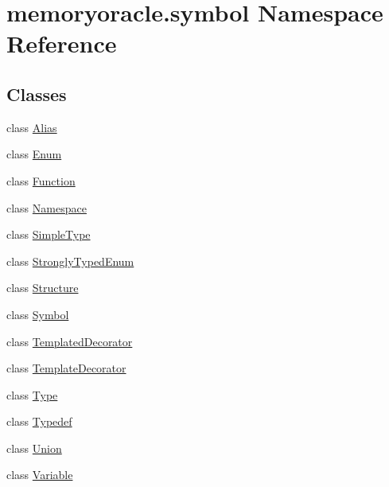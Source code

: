\hypertarget{namespacememoryoracle_1_1symbol}{}\section{memoryoracle.\+symbol Namespace Reference}
\label{namespacememoryoracle_1_1symbol}
\subsection*{Classes}
\begin{DoxyCompactItemize}
\item 
class \hyperlink{classmemoryoracle_1_1symbol_1_1Alias}{Alias}
\item 
class \hyperlink{classmemoryoracle_1_1symbol_1_1Enum}{Enum}
\item 
class \hyperlink{classmemoryoracle_1_1symbol_1_1Function}{Function}
\item 
class \hyperlink{classmemoryoracle_1_1symbol_1_1Namespace}{Namespace}
\item 
class \hyperlink{classmemoryoracle_1_1symbol_1_1SimpleType}{Simple\+Type}
\item 
class \hyperlink{classmemoryoracle_1_1symbol_1_1StronglyTypedEnum}{Strongly\+Typed\+Enum}
\item 
class \hyperlink{classmemoryoracle_1_1symbol_1_1Structure}{Structure}
\item 
class \hyperlink{classmemoryoracle_1_1symbol_1_1Symbol}{Symbol}
\item 
class \hyperlink{classmemoryoracle_1_1symbol_1_1TemplatedDecorator}{Templated\+Decorator}
\item 
class \hyperlink{classmemoryoracle_1_1symbol_1_1TemplateDecorator}{Template\+Decorator}
\item 
class \hyperlink{classmemoryoracle_1_1symbol_1_1Type}{Type}
\item 
class \hyperlink{classmemoryoracle_1_1symbol_1_1Typedef}{Typedef}
\item 
class \hyperlink{classmemoryoracle_1_1symbol_1_1Union}{Union}
\item 
class \hyperlink{classmemoryoracle_1_1symbol_1_1Variable}{Variable}
\end{DoxyCompactItemize}

